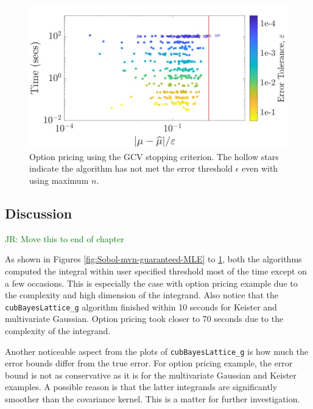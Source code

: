 \documentclass[graybox,footinfo]{svmult}
\newcommand{\code}[1]{\texttt{#1}}
\newcommand{\JRNote}[1]{{\textcolor{green}{JR: #1}}}
\begin{document}
\begin{figure}
\centering
\includegraphics[width=0.95\linewidth]{"figures/Sobol/Sobol_optPrice_guaranteed_time_GCV__d12_r1_2019-Sep-1"}
\caption[Sobol: Option pricing guaranteed: GCV]{Option pricing using the GCV stopping criterion. The hollow stars indicate the algorithm has not met the error threshold $\epsilon$ even with using maximum $n$.}
\label{fig:Sobol-optprice-guaranteed-GCV}
\end{figure}




\subsection{Discussion}
\JRNote{Move this to end of chapter}

As shown in Figures \ref{fig:Sobol-mvn-guaranteed-MLE} to \ref{fig:Sobol-optprice-guaranteed-GCV}, both the algorithms computed the integral within user specified threshold most of the time except on a few occasions. This is especially the case with option pricing example due to the complexity and high dimension of the integrand. 
Also notice that the \code{cubBayesLattice\_g} algorithm finished within 10 seconds for Keister and multivariate Gaussian. Option pricing took closer to 70 seconds due to the complexity of the integrand.

Another noticeable aspect from the plots of \code{cubBayesLattice\_g} is how much the error bounds differ from the true error. For option pricing example, the error bound is not as conservative as it is for the multivariate Gaussian and Keister examples. A possible reason is that the latter integrands are significantly smoother than the covariance kernel.  This is a matter for further investigation.

\end{document}
